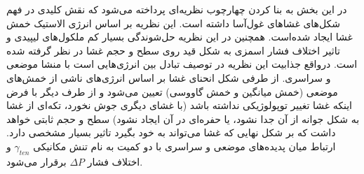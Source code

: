 در این بخش به بنا کردن چهارچوب نظریه‌ای پرداخته می‌شود که نقش کلیدی در فهم شکل‌های غشا‌های غول‌آسا داشته است. این نظریه بر اساس انرژی الاستیک خمش غشا ایجاد شده‌است. همچنین در این نظریه حل‌شوندگی بسیار کم ملکول‌های لیپیدی و تاثیر اختلاف فشار اسمزی به شکل قید روی سطح و حجم غشا در نظر گرفته شده است. درواقع جذابیت این نظریه در توصیف تبادل بین انرژی‌هایی است با منشا موضعی و سراسری. از طرفی شکل انحنای غشا بر اساس انرژی‌های ناشی از خمش‌های موضعی (خمش میانگین و خمش گاووسی) تعیین می‌شود و از طرف دیگر با فرض اینکه غشا تغییر توپولوژیکی نداشته باشد (با غشای دیگری جوش نخورد، تکه‌ای از غشا به شکل جوانه از آن جدا نشود، یا حفره‌ای در آن ایجاد نشود) سطح و حجم ثابتی خواهد داشت که بر شکل نهایی که غشا می‌تواند به خود بگیرد تاثیر بسیار مشخصی دارد. ارتباط میان پدیده‌های موضعی و سراسری با دو کمیت به نام تنش مکانیکی
$\gamma_{ten}$
و اختلاف فشار
$\Delta P$
برقرار می‌شود.

